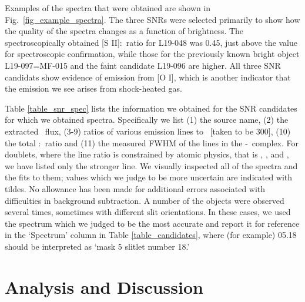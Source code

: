 Examples of the spectra that were obtained are shown in Fig.\ \ref{fig_example_spectra}.   The three SNRs were selected primarily to show how the quality of the spectra changes as a function of brightness.  The spectroscopically obtained [S II]:\ha\ ratio for L19-048 was 0.45, just above the value for spectroscopic confirmation, while those for the previously known bright object L19-097=MF-015 and the faint candidate L19-096 are higher.  All three SNR candidats show evidence of emission from [O I], which is another indicator that the emission we see arises from shock-heated gas. 

Table \ref{table_snr_spec}  lists the information we obtained for the SNR candidates for which we obtained spectra.  Specifically we list (1) the source name, (2) the extracted  \ha\ flux, (3-9) ratios of various emission lines to \ha\ [taken to be 300], (10) the total \sii:\ha\ ratio and (11) the measured FWHM of the lines in the \ha-\nii\ complex.  For doublets, where the line ratio is constrained by atomic physics, that is \oiii, \oi, and \nii, we have listed only the stronger line.  We visually inspected all of the spectra and the fits to them; values which we judge to be more uncertain are indicated with tildes.  No allowance has been made for additional errors associated with difficulties in background subtraction.  A number of the objects were observed several times, sometimes with different slit orientations.  In these cases, we used the spectrum which we judged to be the most accurate and report it for reference in the `Spectrum' column in Table \ref{table_candidates}, where (for example) 05.18 should be interpreted as `mask 5 slitlet number 18.'


\section{Analysis and Discussion}


